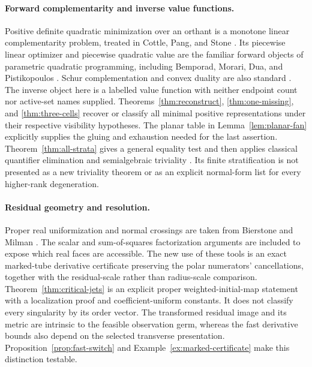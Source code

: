\paragraph{Forward complementarity and inverse value functions.}
Positive definite quadratic minimization over an orthant is a monotone linear complementarity problem, treated in Cottle, Pang, and Stone \cite{CPS}. Its piecewise linear optimizer and piecewise quadratic value are the familiar forward objects of parametric quadratic programming, including Bemporad, Morari, Dua, and Pistikopoulos \cite{BMDP,BMDPc}. Schur complementation and convex duality are also standard \cite{BV}. The inverse object here is a labelled value function with neither endpoint count nor active-set names supplied. Theorems~\ref{thm:reconstruct}, \ref{thm:one-missing}, and \ref{thm:three-cells} recover or classify all minimal positive representations under their respective visibility hypotheses. The planar table in Lemma~\ref{lem:planar-fan} explicitly supplies the gluing and exhaustion needed for the last assertion. Theorem~\ref{thm:all-strata} gives a general equality test and then applies classical quantifier elimination and semialgebraic triviality \cite{BCR,Hardt}. Its finite stratification is not presented as a new triviality theorem or as an explicit normal-form list for every higher-rank degeneration.

\paragraph{Residual geometry and resolution.}
Proper real uniformization and normal crossings are taken from Bierstone and Milman \cite{BM}. The scalar and sum-of-squares factorization arguments are included to expose which real faces are accessible. The new use of these tools is an exact marked-tube derivative certificate preserving the polar numerators' cancellations, together with the residual-scale rather than radius-scale comparison. Theorem~\ref{thm:critical-jets} is an explicit proper weighted-initial-map statement with a localization proof and coefficient-uniform constants. It does not classify every singularity by its order vector. The transformed residual image and its metric are intrinsic to the feasible observation germ, whereas the fast derivative bounds also depend on the selected transverse presentation. Proposition~\ref{prop:fast-switch} and Example~\ref{ex:marked-certificate} make this distinction testable.

